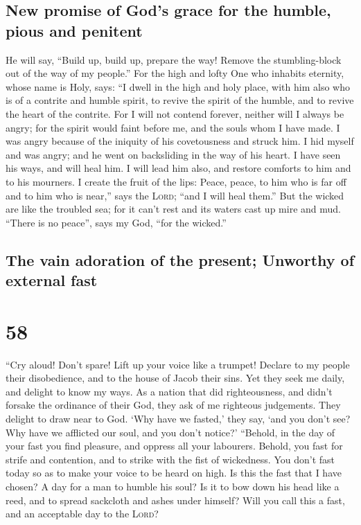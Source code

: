 \hypertarget{new-promise-of-gods-grace-for-the-humble-pious-and-penitent}{%
\subsection{New promise of God's grace for the humble, pious and
penitent}\label{new-promise-of-gods-grace-for-the-humble-pious-and-penitent}}

 He will say, ``Build up, build up, prepare the way!
Remove the stumbling-block out of the way of my people.''
 For the high and lofty One who inhabits eternity, whose
name is Holy, says: ``I dwell in the high and holy place, with him also
who is of a contrite and humble spirit, to revive the spirit of the
humble, and to revive the heart of the contrite.  For I
will not contend forever, neither will I always be angry; for the spirit
would faint before me, and the souls whom I have made.  I
was angry because of the iniquity of his covetousness and struck him. I
hid myself and was angry; and he went on backsliding in the way of his
heart.  I have seen his ways, and will heal him. I will
lead him also, and restore comforts to him and to his mourners.
 I create the fruit of the lips: Peace, peace, to him who
is far off and to him who is near,'' says the \textsc{Lord}; ``and I
will heal them.''  But the wicked are like the troubled
sea; for it can't rest and its waters cast up mire and mud.
 ``There is no peace'', says my God, ``for the wicked.''

\hypertarget{the-vain-adoration-of-the-present-unworthy-of-external-fast}{%
\subsection{The vain adoration of the present; Unworthy of external
fast}\label{the-vain-adoration-of-the-present-unworthy-of-external-fast}}

\hypertarget{section-57}{%
\section{58}\label{section-57}}

 ``Cry aloud! Don't spare! Lift up your voice like a
trumpet! Declare to my people their disobedience, and to the house of
Jacob their sins.  Yet they seek me daily, and delight to
know my ways. As a nation that did righteousness, and didn't forsake the
ordinance of their God, they ask of me righteous judgements. They
delight to draw near to God.  `Why have we fasted,' they
say, `and you don't see? Why have we afflicted our soul, and you don't
notice?' ``Behold, in the day of your fast you find pleasure, and
oppress all your labourers.  Behold, you fast for strife
and contention, and to strike with the fist of wickedness. You don't
fast today so as to make your voice to be heard on high. 
Is this the fast that I have chosen? A day for a man to humble his soul?
Is it to bow down his head like a reed, and to spread sackcloth and
ashes under himself? Will you call this a fast, and an acceptable day to
the \textsc{Lord}?

